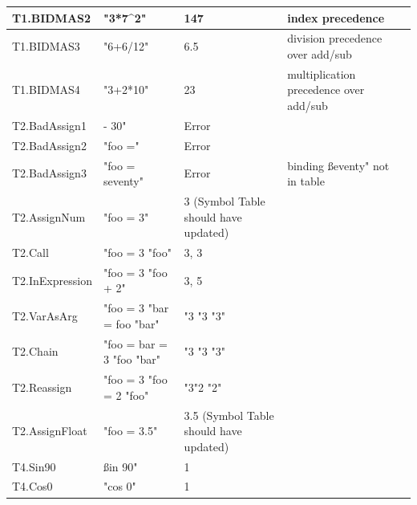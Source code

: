 \documentclass[a4paper, oneside, 11pt]{report}
\begin{document}
\begin{table}
\begin{tabular}{|p{1.5in}|p{1.5in}|p{1.6in}|p{1.6in}|p{2.4in}|}
\hline
T1.BIDMAS2      & "3*7\^{}2"                & 147                                    & index precedence                        \\ 
\hline
T1.BIDMAS3      & "6+6/12"                  & 6.5                                    & division precedence over add/sub        \\ 
\hline
T1.BIDMAS4      & "3+2*10"                  & 23                                     & multiplication precedence over add/sub  \\ 
\hline
T2.BadAssign1   & - 30"                     & Error                                  &                                         \\ 
\hline
T2.BadAssign2   & "foo ="                   & Error                                  &                                         \\ 
\hline
T2.BadAssign3   & "foo = seventy"           & Error                                  & binding ßeventy" not in table           \\ 
\hline
T2.AssignNum    & "foo = 3"                 & 3 (Symbol Table should have updated)   &                                         \\ 
\hline
T2.Call         & "foo = 3 "foo"            & 3, 3                                   &                                         \\ 
\hline
T2.InExpression & "foo = 3 "foo + 2"        & 3, 5                                   &                                         \\ 
\hline
T2.VarAsArg     & "foo = 3 "bar = foo "bar" & "3 "3 "3"                              &                                         \\ 
\hline
T2.Chain        & "foo = bar = 3 "foo "bar" & "3 "3 "3"                              &                                         \\ 
\hline
T2.Reassign     & "foo = 3 "foo = 2 "foo"   & "3"2 "2"                               &                                         \\ 
\hline
T2.AssignFloat  & "foo = 3.5"               & 3.5 (Symbol Table should have updated) &                                         \\ 
\hline
T4.Sin90        & ßin 90"                   & 1                                      &                                         \\ 
\hline
T4.Cos0         & "cos 0"                   & 1                                      &                                         \\ 

\end{tabular}
\end{table}
\end{document}
